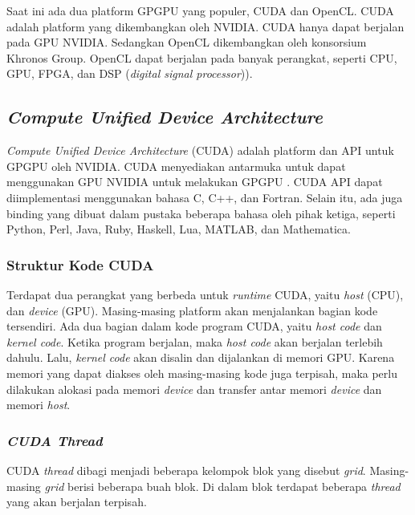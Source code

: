   Saat ini ada dua platform GPGPU yang populer, CUDA dan OpenCL. CUDA adalah platform yang dikembangkan oleh NVIDIA. CUDA hanya dapat berjalan pada GPU NVIDIA. Sedangkan OpenCL dikembangkan oleh konsorsium Khronos Group. OpenCL dapat berjalan pada banyak perangkat, seperti CPU, GPU, FPGA, dan DSP (\emph{digital signal processor})).

  \subsection{\emph{Compute Unified Device Architecture}}

    \emph{Compute Unified Device Architecture} (CUDA) adalah platform dan API untuk GPGPU oleh NVIDIA. CUDA menyediakan antarmuka untuk dapat menggunakan GPU NVIDIA untuk melakukan GPGPU \parencite{cuda}. CUDA API dapat diimplementasi menggunakan bahasa C, C++, dan Fortran. Selain itu, ada juga binding yang dibuat dalam pustaka beberapa bahasa oleh pihak ketiga, seperti Python, Perl, Java, Ruby, Haskell, Lua, MATLAB, dan Mathematica.

    \subsubsection{Struktur Kode CUDA}

      Terdapat dua perangkat yang berbeda untuk \emph{runtime} CUDA, yaitu \emph{host} (CPU), dan \emph{device} (GPU). Masing-masing platform akan menjalankan bagian kode tersendiri. Ada dua bagian dalam kode program CUDA, yaitu \emph{host code} dan \emph{kernel code}. Ketika program berjalan, maka \emph{host code} akan berjalan terlebih dahulu. Lalu, \emph{kernel code} akan disalin dan dijalankan di memori GPU. Karena memori yang dapat diakses oleh masing-masing kode juga terpisah, maka perlu dilakukan alokasi pada memori \emph{device} dan transfer antar memori \emph{device} dan memori \emph{host}.

    \subsubsection{\emph{CUDA Thread}}

      CUDA \emph{thread} dibagi menjadi beberapa kelompok blok yang disebut \emph{grid}. Masing-masing \emph{grid} berisi beberapa buah blok. Di dalam blok terdapat beberapa \emph{thread} yang akan berjalan terpisah. 

